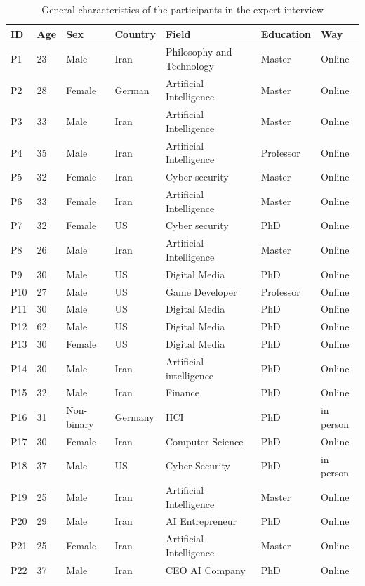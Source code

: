 \documentclass[sigconf]{acmart}
\begin{document}
\begin{table}[h]
\centering
\small %
\caption{General characteristics of the participants in the expert interview}
\label{Table1}
\begin{tabular}{p{0.5cm}p{0.5cm}p{1.8cm}p{1.5cm}p{3.8cm}p{1.5cm}p{1.2cm}}
\hline
ID & Age & Sex & Country & Field &Education& Way\\
\hline

P1 & 23 & Male& Iran & Philosophy and Technology & Master &Online\\
P2 & 28 & Female& German & Artificial Intelligence & Master & Online\\
P3 & 33 & Male& Iran & Artificial Intelligence & Master & Online\\
P4 & 35 & Male& Iran & Artificial Intelligence & Professor & Online\\
P5 & 32 & Female& Iran & Cyber security & Master & Online\\
P6 & 33 & Female& Iran & Artificial Intelligence & Master & Online\\
P7 & 32 & Female& US & Cyber security  &PhD & Online\\
P8 & 26 & Male& Iran & Artificial Intelligence  & Master & Online\\
P9 & 30 &Male& US & Digital Media  & PhD & Online \\
P10 & 27 & Male& US & Game Developer & Professor &Online\\
P11 & 30 & Male& US & Digital Media & PhD &Online\\
P12 & 62 & Male& US & Digital Media & PhD &Online\\
P13 & 30 & Female& US & Digital Media & PhD &Online\\
P14 & 30 & Male& Iran & Artificial intelligence & PhD &Online\\
P15 & 32 & Male& Iran & Finance& PhD &Online\\
P16 & 31 & Non-binary& Germany & HCI & PhD &in person\\
P17 & 30 & Female& Iran & Computer Science & PhD &Online\\
P18 & 37 & Male& US & Cyber Security & PhD &in person\\
P19 & 25 & Male& Iran & Artificial Intelligence & Master &Online\\
P20 & 29 & Male& Iran & AI Entrepreneur & PhD &Online\\
P21 & 25 & Female& Iran & Artificial Intelligence & Master &Online\\
P22 & 37 & Male& Iran & CEO AI Company & PhD &Online\\

\end{tabular}
\end{table}
\end{document}

